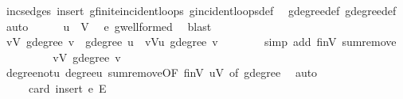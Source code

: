 \begin{isabellebody}
\ inc{\isacharunderscore}{\kern0pt}sedges\ insert{\isacharparenleft}{\kern0pt}{}{\isacharparenright}{\kern0pt}\ g{\isachardot}{\kern0pt}finite{\isacharunderscore}{\kern0pt}incident{\isacharunderscore}{\kern0pt}loops\ g{\isachardot}{\kern0pt}incident{\isacharunderscore}{\kern0pt}loops{\isacharunderscore}{\kern0pt}def\ \isamarkupfalse%
\ g{\isacharprime}{\kern0pt}{\isachardot}{\kern0pt}degree{\isacharunderscore}{\kern0pt}def\ g{\isachardot}{\kern0pt}degree{\isacharunderscore}{\kern0pt}def\ \isamarkupfalse%
\ auto\isanewline
\ \ \ \ \isamarkupfalse%
\ {\isachardoublequoteopen}u\ {\isasymin}\ V{\isachardoublequoteclose}\ \isamarkupfalse%
\ e\ g{\isacharprime}{\kern0pt}{\isachardot}{\kern0pt}wellformed\ \isamarkupfalse%
\ blast\isanewline
\ \ \ \ \isamarkupfalse%
\ \isamarkupfalse%
\ {\isachardoublequoteopen}{\isacharparenleft}{\kern0pt}{\isasymSum}v{\isasymin}V{\isachardot}{\kern0pt}\ g{\isacharprime}{\kern0pt}{\isachardot}{\kern0pt}degree\ v{\isacharparenright}{\kern0pt}\ {\isacharequal}{\kern0pt}\ g{\isacharprime}{\kern0pt}{\isachardot}{\kern0pt}degree\ u\ {\isacharplus}{\kern0pt}\ {\isacharparenleft}{\kern0pt}{\isasymSum}v{\isasymin}V{\isacharminus}{\kern0pt}{\isacharbraceleft}{\kern0pt}u{\isacharbraceright}{\kern0pt}{\isachardot}{\kern0pt}\ g{\isacharprime}{\kern0pt}{\isachardot}{\kern0pt}degree\ v{\isacharparenright}{\kern0pt}{\isachardoublequoteclose}\isanewline
\ \ \ \ \ \ \isamarkupfalse%
\ {\isacharparenleft}{\kern0pt}simp\ add{\isacharcolon}{\kern0pt}\ finV\ sum{\isachardot}{\kern0pt}remove{\isacharparenright}{\kern0pt}\isanewline
\ \ \ \ \isamarkupfalse%
\ \isamarkupfalse%
\ {\isachardoublequoteopen}{\isasymdots}\ {\isacharequal}{\kern0pt}\ {\isacharparenleft}{\kern0pt}{\isasymSum}v{\isasymin}V{\isachardot}{\kern0pt}\ g{\isachardot}{\kern0pt}degree\ v{\isacharparenright}{\kern0pt}\ {\isacharplus}{\kern0pt}\ {}{\isachardoublequoteclose}\ \isamarkupfalse%
\ degree{\isacharunderscore}{\kern0pt}not{\isacharunderscore}{\kern0pt}u\ degree{\isacharunderscore}{\kern0pt}u\ sum{\isachardot}{\kern0pt}remove{\isacharbrackleft}{\kern0pt}OF\ finV\ {\isacartoucheopen}u{\isasymin}V{\isacartoucheclose}{\isacharcomma}{\kern0pt}\ of\ g{\isachardot}{\kern0pt}degree{\isacharbrackright}{\kern0pt}\ \isamarkupfalse%
\ auto\isanewline
\ \ \ \ \isamarkupfalse%
\ \isamarkupfalse%
\ {\isachardoublequoteopen}{\isasymdots}\ {\isacharequal}{\kern0pt}\ {}\ {\isacharasterisk}{\kern0pt}\ card\ {\isacharparenleft}{\kern0pt}insert\ e\ E{\isacharprime}{\kern0pt}{\isacharparenright}{\kern0pt}{\isachardoublequoteclose}\ \isamarkupfalse%

\end{isabellebody}
